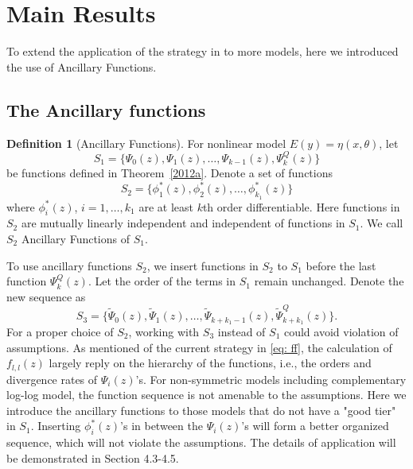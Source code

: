 \documentclass[11pt]{amsart}
\theoremstyle{definition}
\newtheorem{definition}{Definition}[section]
\theoremstyle{remark}
\numberwithin{equation}{section}
\begin{document}

\section{Main Results}
To extend the application of the strategy in \cite{yang2012} to more models, here we introduced the use of Ancillary Functions.  
\subsection{The Ancillary functions} 
\begin{definition}[Ancillary Functions]
    For nonlinear model $E(y) = \eta(x,\theta)$, let \[S_1 = \{\Psi_0(z), \Psi_1(z), \ldots,\Psi_{k-1}(z) ,\Psi_k^Q(z)\}\] be functions defined in Theorem~\ref{2012a}. Denote a set of functions \[ S_2 =\{\phi^*_1(z), \phi^*_2(z),\ldots, \phi^*_{k_1}(z)\}\] where $\phi^*_i(z)$, $i=1,\ldots,k_1$ are at least $k$th order differentiable.  Here functions in $S_2$ are mutually linearly independent and independent of functions in $S_1$. We call $S_2$ Ancillary Functions of $S_1$.
\end{definition}

 To use ancillary functions $S_2$, we insert functions in $S_2$ to $S_1$ before the last function $\Psi_k^Q(z)$. Let the order of the terms in $S_1$ remain unchanged. Denote the new sequence as  \[S_3 = \{\tilde{\Psi}_0(z), \tilde{\Psi}_1(z), \ldots,\tilde{\Psi}_{k+k_1-1}(z), \tilde{\Psi}_{k+k_1}^Q(z)\}.\] For a proper choice of $S_2$, working with $S_3$ instead of $S_1$ could avoid violation of assumptions. As mentioned of the current strategy in \eqref{eq: ff}, the calculation of $f_{l,l}(z)$ largely reply on the hierarchy of the functions, i.e., the orders and divergence rates of $\Psi_i(z)$'s. For non-symmetric models including complementary log-log model, the function sequence is not amenable to the assumptions. Here we introduce the ancillary functions to those models that do not have a "good tier" in $S_1$. Inserting $\phi_i^*(z)$'s in between the $\Psi_i(z)$'s will form a better organized sequence, which will not violate the assumptions. The details of application will be demonstrated in Section 4.3-4.5.
\end{document}
